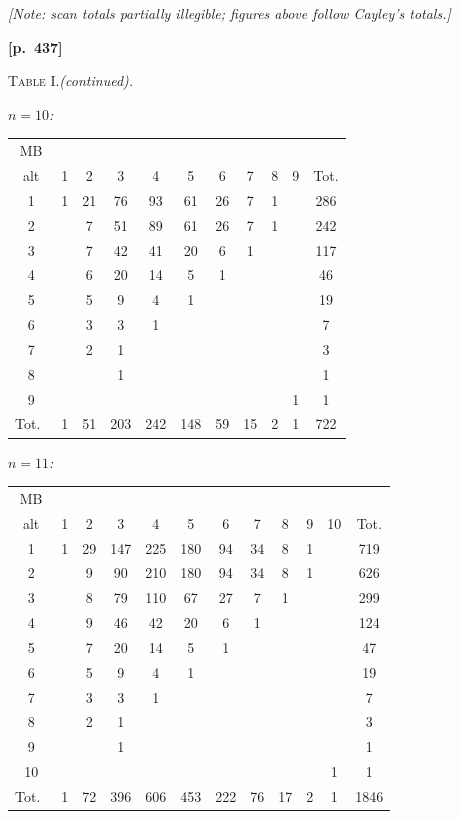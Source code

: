 \documentclass[11pt,a4paper]{article}
\begin{document}
\noindent\textit{[Note: scan totals partially illegible; figures above follow Cayley's totals.]}

\bigskip
\noindent\textbf{[p.~437]}\quad
\begin{center}
\textsc{Table I.}\quad\textit{(continued).}
\end{center}

\noindent\textit{$n=10$:}
\begin{center}
\begin{tabular}{c|ccccccccc|c}
MB \\ alt & 1 & 2 & 3 & 4 & 5 & 6 & 7 & 8 & 9 & Tot.\\\hline
1 & 1 & 21 & 76 & 93 & 61 & 26 & 7 & 1 & & 286\\
2 & & 7 & 51 & 89 & 61 & 26 & 7 & 1 & & 242\\
3 & & 7 & 42 & 41 & 20 & 6 & 1 & & & 117\\
4 & & 6 & 20 & 14 & 5 & 1 & & & & 46\\
5 & & 5 & 9 & 4 & 1 & & & & & 19\\
6 & & 3 & 3 & 1 & & & & & & 7\\
7 & & 2 & 1 & & & & & & & 3\\
8 & & & 1 & & & & & & & 1\\
9 & & & & & & & & & 1 & 1\\\hline
Tot.\ & 1 & 51 & 203 & 242 & 148 & 59 & 15 & 2 & 1 & 722
\end{tabular}
\end{center}

\noindent\textit{$n=11$:}
\begin{center}
\begin{tabular}{c|cccccccccc|c}
MB \\ alt & 1 & 2 & 3 & 4 & 5 & 6 & 7 & 8 & 9 & 10 & Tot.\\\hline
1 & 1 & 29 & 147 & 225 & 180 & 94 & 34 & 8 & 1 & & 719\\
2 & & 9 & 90 & 210 & 180 & 94 & 34 & 8 & 1 & & 626\\
3 & & 8 & 79 & 110 & 67 & 27 & 7 & 1 & & & 299\\
4 & & 9 & 46 & 42 & 20 & 6 & 1 & & & & 124\\
5 & & 7 & 20 & 14 & 5 & 1 & & & & & 47\\
6 & & 5 & 9 & 4 & 1 & & & & & & 19\\
7 & & 3 & 3 & 1 & & & & & & & 7\\
8 & & 2 & 1 & & & & & & & & 3\\
9 & & & 1 & & & & & & & & 1\\
10 & & & & & & & & & & 1 & 1\\\hline
Tot.\ & 1 & 72 & 396 & 606 & 453 & 222 & 76 & 17 & 2 & 1 & 1846
\end{tabular}
\end{center}
\end{document}
